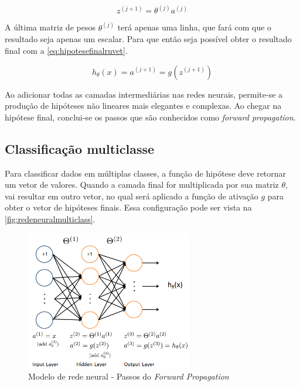 \begin{equation} \label{eq:proximovetorz}
z^{(j+1)} =  \theta^{(j)}a^{(j)}
\end{equation}

A última matriz de pesos $\theta^{(j)}$ terá apenas uma linha, que fará com que o resultado seja apenas um escalar. Para que então seja possível obter o resultado final com a \autoref{eq:hipotesefinalrnvet}.

\begin{equation} \label{eq:hipotesefinalrnvet}
h_{\theta}(x) = a^{(j+1)} = g(z^{(j+1)})
\end{equation}

Ao adicionar todas as camadas intermediárias nas redes neurais, permite-se a produção de hipóteses não lineares mais elegantes e complexas. Ao chegar na hipótese final, conclui-se os passos que são conhecidos como \textit{forward propagation}.


\subsection{Classificação multiclasse}\label{subsec:clasmultirn}

Para classificar dados em múltiplas classes, a função de hipótese deve retornar um vetor de valores. Quando a camada final for multiplicada por sua matriz $\theta$, vai resultar em outro vetor, no qual será aplicado a função de ativação $g$ para obter o vetor de hipóteses finais. Essa configuração pode ser vista na \autoref{fig:redeneuralmulticlass}.

\begin{figure}
\centering
\caption{Modelo de rede neural - Passos do \textit{Forward Propagation}} \label{fig:redeneuralmulticlass}
\includegraphics[width=0.65\textwidth]{img/redeneuralmulticlass}
\end{figure}

